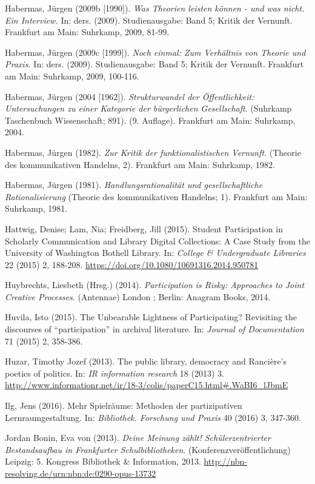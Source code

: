 \documentclass[a4paper,
fontsize=11pt,
oneside,
numbers=noperiodatend,
parskip=half-,
bibliography=totoc,
final
]{scrartcl}
\begin{document}
Habermas, Jürgen (2009b {[}1990{]}). \emph{Was Theorien leisten können -
und was nicht. Ein Interview.} In: ders. (2009). Studienausgabe: Band 5;
Kritik der Vernunft. Frankfurt am Main: Suhrkamp, 2009, 81-99.

Habermas, Jürgen (2009c {[}1999{]}). \emph{Noch einmal: Zum Verhältnis
von Theorie und Praxis.} In: ders. (2009). Studienausgabe: Band 5;
Kritik der Vernunft. Frankfurt am Main: Suhrkamp, 2009, 100-116.

Habermas, Jürgen (2004 {[}1962{]}). \emph{Strukturwandel der
Öffentlichkeit: Untersuchungen zu einer Kategorie der bürgerlichen
Gesellschaft}. (Suhrkamp Taschenbuch Wissenschaft; 891). (9. Auflage).
Frankfurt am Main: Suhrkamp, 2004.

Habermas, Jürgen (1982). \emph{Zur Kritik der funktionalistischen
Vernunft}. (Theorie des kommunikativen Handelns, 2). Frankfurt am Main:
Suhrkamp, 1982.

Habermas, Jürgen (1981). \emph{Handlungsrationalität und
gesellschaftliche Rationalisierung} (Theorie des kommunikativen
Handelns; 1). Frankfurt am Main: Suhrkamp, 1981.

Hattwig, Denise; Lam, Nia; Freidberg, Jill (2015). Student Participation
in Scholarly Communication and Library Digital Collections: A Case Study
from the University of Washington Bothell Library. In: \emph{College \&
Undergraduate Libraries} 22 (2015) 2, 188-208.
\href{http://dx.doi.org/10.1080/10691316.2014.950781}{https://doi.org/10.1080/10691316.2014.950781}

Huybrechts, Liesbeth (Hrsg.) (2014). \emph{Participation is Risky:
Approaches to Joint Creative Processes}. (Antennae) London ; Berlin:
Anagram Books, 2014.

Huvila, Isto (2015). The Unbearable Lightness of Participating?
Revisiting the discourses of \enquote{participation} in archival
literature. In: \emph{Journal of Documentation} 71 (2015) 2, 358-386.

Huzar, Timothy Jozef (2013). The public library, democracy and
Rancière's poetics of politics. In: \emph{IR information research} 18
(2013) 3.
\url{http://www.informationr.net/ir/18-3/colis/paperC15.html\#.WaBI6_lJbmE}

Ilg, Jens (2016). Mehr Spielräume: Methoden der partizipativen
Lernraumgestaltung. In: \emph{Bibliothek. Forschung und Praxis} 40
(2016) 3, 347-360.

Jordan Bonin, Eva von (2013). \emph{Deine Meinung zählt!
Schülerzentrierter Bestandsaufbau in Frankfurter Schulbibliotheken}.
(Konferenzveröffentlichung) Leipzig: 5. Kongress Bibliothek \&
Information, 2013.
\url{http://nbn-resolving.de/urn:nbn:de:0290-opus-13732}
\end{document}
